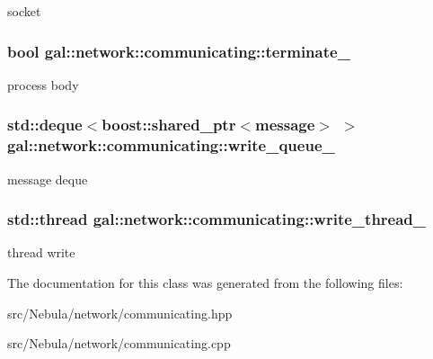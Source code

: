 socket \hypertarget{classgal_1_1network_1_1communicating_a4dc031687aa84ce7e3cca5ce9839d5d7}{
\subsubsection[{terminate\-\_\-}]{\setlength{\rightskip}{0pt plus 5cm}bool {\bf gal\-::network\-::communicating\-::terminate\-\_\-}}}\label{classgal_1_1network_1_1communicating_a4dc031687aa84ce7e3cca5ce9839d5d7}
process body \hypertarget{classgal_1_1network_1_1communicating_a5d0757e59bab953f76f65edfc1b3bd15}{
\subsubsection[{write\-\_\-queue\-\_\-}]{\setlength{\rightskip}{0pt plus 5cm}std\-::deque$<$boost\-::shared\-\_\-ptr$<${\bf message}$>$ $>$ {\bf gal\-::network\-::communicating\-::write\-\_\-queue\-\_\-}}}\label{classgal_1_1network_1_1communicating_a5d0757e59bab953f76f65edfc1b3bd15}
message deque \hypertarget{classgal_1_1network_1_1communicating_afc83d88ea30befb842e16a5cf7d5e936}{
\subsubsection[{write\-\_\-thread\-\_\-}]{\setlength{\rightskip}{0pt plus 5cm}std\-::thread {\bf gal\-::network\-::communicating\-::write\-\_\-thread\-\_\-}}}\label{classgal_1_1network_1_1communicating_afc83d88ea30befb842e16a5cf7d5e936}
thread write 

\-The documentation for this class was generated from the following files\-:\begin{DoxyCompactItemize}
\item 
src/\-Nebula/network/communicating.\-hpp\item 
src/\-Nebula/network/communicating.\-cpp\end{DoxyCompactItemize}
